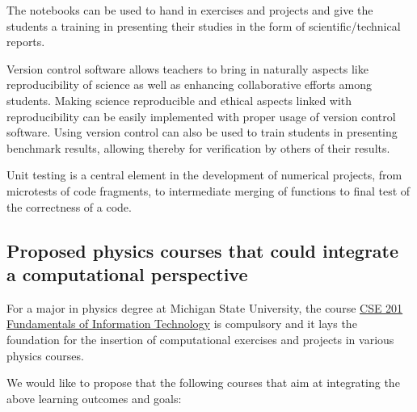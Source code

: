 \documentclass[%
oneside,                 %
final,                   %
10pt]{article}
\begin{document}
\noindent
The notebooks can be used to hand in exercises and projects and give the students a training in presenting their studies in the form of scientific/technical reports.

Version control software allows teachers to bring in naturally aspects like reproducibility of science as well as enhancing
collaborative efforts among students. Making science reproducible and ethical aspects linked with reproducibility can be easily implemented with proper usage of version control software. Using version control can also be used to train students in presenting benchmark results, allowing thereby for verification by others of their results. 

Unit testing is a central element in the development of numerical projects, from microtests of code fragments, to intermediate merging of functions to final test of the correctness of a code.

\subsection*{Proposed physics courses that could integrate a computational perspective}

For a major in physics degree at Michigan State University, the course \href{{https://www.cse.msu.edu/~cse201/}}{CSE 201 Fundamentals of Information Technology} is compulsory and it lays the foundation for the insertion of computational exercises and projects in various physics courses. 

We would like to propose that the following courses that aim at integrating the above learning outcomes and goals:
\end{document}
